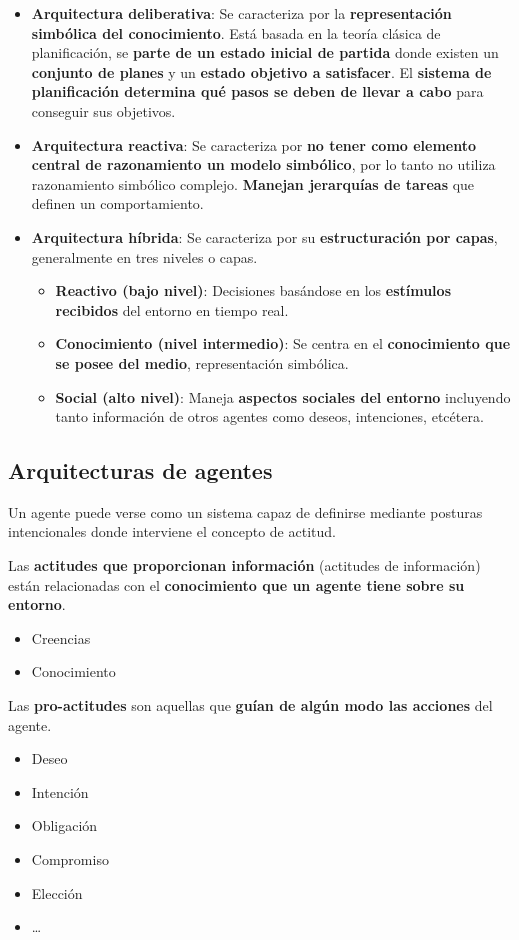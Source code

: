 \documentclass[12pt, twoside, openright]{report} %
\begin{document}
\begin{itemize}
	\item \textbf{Arquitectura deliberativa}: Se caracteriza por la \textbf{representación simbólica del conocimiento}. Está basada en la teoría clásica de planificación, se \textbf{parte de un estado inicial de partida} donde existen un \textbf{conjunto de planes} y un \textbf{estado objetivo a satisfacer}. El \textbf{sistema de planificación determina qué pasos se deben de llevar a cabo} para conseguir sus objetivos.
	\item \textbf{Arquitectura reactiva}: Se caracteriza por \textbf{no tener como elemento central de razonamiento un modelo simbólico}, por lo tanto no utiliza razonamiento simbólico complejo. \textbf{Manejan jerarquías de tareas} que definen un comportamiento.
	\item \textbf{Arquitectura híbrida}: Se caracteriza por su \textbf{estructuración por capas}, generalmente en tres niveles o capas. 
	\begin{itemize}
		\item \textbf{Reactivo (bajo nivel)}: Decisiones basándose en los \textbf{estímulos recibidos} del entorno en tiempo real.
		\item \textbf{Conocimiento (nivel intermedio)}: Se centra en el \textbf{conocimiento que se posee del medio}, representación simbólica.
		\item \textbf{Social (alto nivel)}: Maneja \textbf{aspectos sociales del entorno} incluyendo tanto información de otros agentes como deseos, intenciones, etcétera.
	\end{itemize}
\end{itemize}
\pagebreak

\subsection{Arquitecturas de agentes}
Un agente puede verse como un sistema capaz de definirse mediante posturas intencionales donde interviene el concepto de actitud. 

Las \textbf{actitudes que proporcionan información} (actitudes de información) están relacionadas con el \textbf{conocimiento que un agente tiene sobre su entorno}.
\begin{itemize}
	\item Creencias
	\item Conocimiento
\end{itemize}
Las \textbf{pro-actitudes} son aquellas que \textbf{guían de algún modo las acciones} del agente.
\begin{itemize}
	\item Deseo
	\item Intención
	\item Obligación
	\item Compromiso
	\item Elección
	\item …
\end{itemize} 
\end{document}
